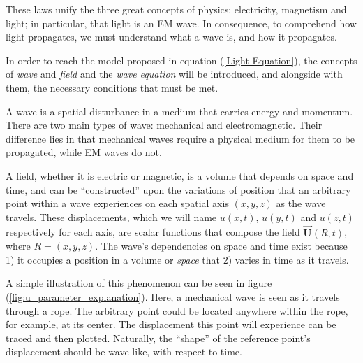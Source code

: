 These laws unify the three great concepts of physics: electricity, magnetism and light; in particular, that light is an EM wave\footnotemark. In consequence, to comprehend how light propagates, we must understand what a wave is, and how it propagates. 


In order to reach the model proposed in equation (\ref{Light Equation}), the concepts of \textit{wave} and \textit{field} and the \textit{wave equation} will be introduced, and alongside with them, the necessary conditions that must be met.

A wave is a spatial disturbance in a medium that carries energy and momentum. There are two\footnotemark{} main types of wave: mechanical and electromagnetic. Their difference lies in that mechanical waves require a physical medium for them to be propagated, while EM waves do not.


A field, whether it is electric or magnetic, is a volume that depends on space and time, and can be ``constructed'' upon the variations of position that an arbitrary point within a wave experiences on each spatial axis $(x,y,z)$ as the wave travels. These displacements, which we will name $u(x,t)$, $u(y,t)$ and $u(z,t)$ respectively for each axis, are scalar functions that compose the field $\overrightarrow{\textbf{U}}(R,t)$, where $R = (x,y,z)$. The wave's dependencies on space and time exist because 1) it occupies a position in a volume or \textit{space} that 2) varies in time as it travels.

A simple illustration of this phenomenon can be seen in figure (\ref{fig:u_parameter_explanation}). Here, a mechanical wave is seen as it travels through a rope. The arbitrary point could be located anywhere within the rope, for example, at its center. The displacement this point will experience can be traced and then plotted. Naturally, the ``shape'' of the reference point's displacement should be wave-like, with respect to time. 

